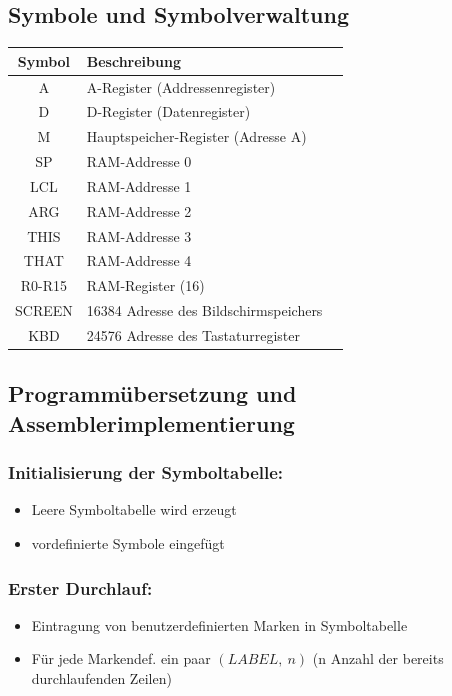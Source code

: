 \documentclass[12pt]{report}
\begin{document}
\subsection{Symbole und Symbolverwaltung}

\begin{table}[H]
  \centering

  \begin{tabular}{c|ll}
    Symbol & Beschreibung                          & \\\hline
    A      & A-Register (Addressenregister)        & \\
    D      & D-Register (Datenregister)            & \\
    M      & Hauptspeicher-Register (Adresse A)    & \\
    SP     & RAM-Addresse 0                        & \\
    LCL    & RAM-Addresse 1                        & \\
    ARG    & RAM-Addresse 2                        & \\
    THIS   & RAM-Addresse 3                        & \\
    THAT   & RAM-Addresse 4                        & \\
    R0-R15 & RAM-Register (16)                     & \\
    SCREEN & 16384 Adresse des Bildschirmspeichers & \\
    KBD    & 24576 Adresse des Tastaturregister    & \\
  \end{tabular}
\end{table}

\subsection{Programmübersetzung und Assemblerimplementierung}

\subsubsection{Initialisierung der Symboltabelle:}
\begin{itemize}
  \item Leere Symboltabelle wird erzeugt
  \item vordefinierte Symbole eingefügt
\end{itemize}

\subsubsection{Erster Durchlauf:}
\begin{itemize}
  \item Eintragung von benutzerdefinierten Marken in Symboltabelle
  \item Für jede Markendef. ein paar $(LABEL,\ n)$ (n Anzahl der bereits durchlaufenden Zeilen)
\end{itemize}
\end{document}
